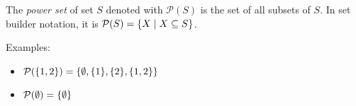 \bigskip
\begin{definition}
    The \emph{power set} of set \(S\) denoted with \(\mathcal{P}(S)\) is the set of all subsets of \(S\). In set builder notation, it is \(\mathcal{P}(S)=\{X\mid X\subseteq S\}\).
\end{definition}

Examples:
\begin{itemize}
    \item \(\mathcal{P}(\{1,2\})=\{\emptyset,\{1\},\{2\},\{1,2\}\}\)
    \item \(\mathcal{P}(\emptyset)=\{\emptyset\}\)
\end{itemize}